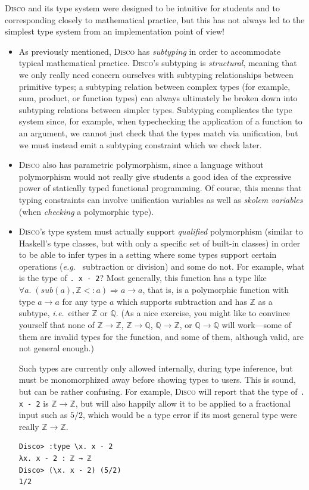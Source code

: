 \documentclass[copyright,creativecommons,11pt]{eptcs}
\newcommand{\disco}{\textsc{Disco}\xspace}
\newcommand{\ie}{\emph{i.e.}\ }
\newcommand{\eg}{\emph{e.g.}\ }
\newcommand{\Z}{\mathbb{Z}}
\newcommand{\Q}{\mathbb{Q}}
\begin{document}
\disco and its type system were designed to be intuitive for students
and to corresponding closely to mathematical practice, but this has
not always led to the simplest type system from an implementation
point of view!

\begin{itemize}
\item As previously mentioned, \disco has \emph{subtyping} in order to
  accommodate typical mathematical practice.  \disco's subtyping is
  \emph{structural}, meaning that we only really need concern
  ourselves with subtyping relationships between primitive types; a
  subtyping relation between complex types (for example, sum, product,
  or function types) can always ultimately be broken down into
  subtyping relations between simpler types.  Subtyping complicates
  the type system since, for example, when typechecking the
  application of a function to an argument, we cannot just check that
  the types match via unification, but we must instead emit a
  subtyping constraint which we check later.

\item \disco also has parametric polymorphism, since a language
  without polymorphism would not really give students a good idea of
  the expressive power of statically typed functional programming.  Of
  course, this means that typing constraints can involve unification
  variables as well as \emph{skolem variables} (when \emph{checking} a
  polymorphic type).

\item \disco's type system must actually support \emph{qualified}
  polymorphism (similar to Haskell's type classes, but with only a
  specific set of built-in classes) in order to be able to infer types
  in a setting where some types support certain operations (\eg
  subtraction or division) and some do not.  For example, what is the
  type of \texttt{\x. x - 2}?  Most generally, this function
  has a type like
  $\forall a.\; (\textit{sub}(a), \Z <: a) \Rightarrow a \to a$, that
  is, is a polymorphic function with type $a \to a$ for any type $a$
  which supports subtraction and has $\Z$ as a subtype, \ie either
  $\Z$ or $\Q$.  (As a nice exercise, you might like to convince
  yourself that none of $\Z \to \Z$, $\Z \to \Q$, $\Q \to \Z$, or $\Q
  \to \Q$ will work---some of them are invalid types for the function,
  and some of them, although valid, are not general enough.)

  Such types are currently only allowed internally, during type
  inference, but must be monomorphized away before showing types to
  users. This is sound, but can be rather confusing.  For example,
  \disco will report that the type of \texttt{\x. x - 2} is
  $\Z \to \Z$, but will also happily allow it to be applied to a
  fractional input such as $5/2$, which would be a type error if its
  most general type were really $\Z \to \Z$.
{\small \begin{verbatim}
Disco> :type \x. x - 2
λx. x - 2 : ℤ → ℤ
Disco> (\x. x - 2) (5/2)
1/2
\end{verbatim}}


\end{itemize}
\end{document}
